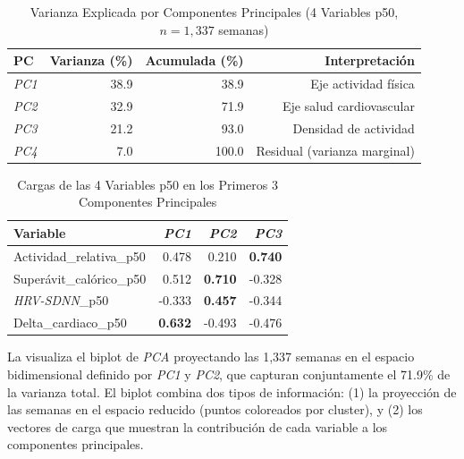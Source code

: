 \begin{table}[H]
    \centering
    \caption{Varianza Explicada por Componentes Principales (4 Variables p50, $n=1,337$ semanas)}
    \label{tab:pca_variance}
    \small
    \begin{tabular}{@{}lrrr@{}}
        \toprule
        \textbf{PC} & \textbf{Varianza (\%)} & \textbf{Acumulada (\%)} & \textbf{Interpretación} \\
        \midrule
        \textit{PC1} & 38.9 & 38.9 & Eje actividad física \\
        \textit{PC2} & 32.9 & 71.9 & Eje salud cardiovascular \\
        \textit{PC3} & 21.2 & 93.0 & Densidad de actividad \\
        \textit{PC4} & 7.0  & 100.0 & Residual (varianza marginal) \\
        \bottomrule
    \end{tabular}
\end{table}

\begin{table}[H]
    \centering
    \caption{Cargas de las 4 Variables p50 en los Primeros 3 Componentes Principales}
    \label{tab:pca_loadings}
    \small
    \begin{tabular}{@{}lrrr@{}}
        \toprule
        \textbf{Variable} & \textbf{\textit{PC1}} & \textbf{\textit{PC2}} & \textbf{\textit{PC3}} \\
        \midrule
        Actividad\_relativa\_p50     & 0.478 & 0.210 & \textbf{0.740} \\
        Superávit\_calórico\_p50     & 0.512 & \textbf{0.710} & -0.328 \\
        \textit{HRV-SDNN}\_p50               & -0.333 & \textbf{0.457} & -0.344 \\
        Delta\_cardiaco\_p50         & \textbf{0.632} & -0.493 & -0.476 \\
        \bottomrule
    \end{tabular}
\end{table}

\FloatBarrier

La  visualiza el biplot de \textit{PCA} proyectando las 1,337 semanas en el espacio bidimensional definido por \textit{PC1} y \textit{PC2}, que capturan conjuntamente el 71.9\% de la varianza total. El biplot combina dos tipos de información: (1) la proyección de las semanas en el espacio reducido (puntos coloreados por cluster), y (2) los vectores de carga que muestran la contribución de cada variable a los componentes principales.

